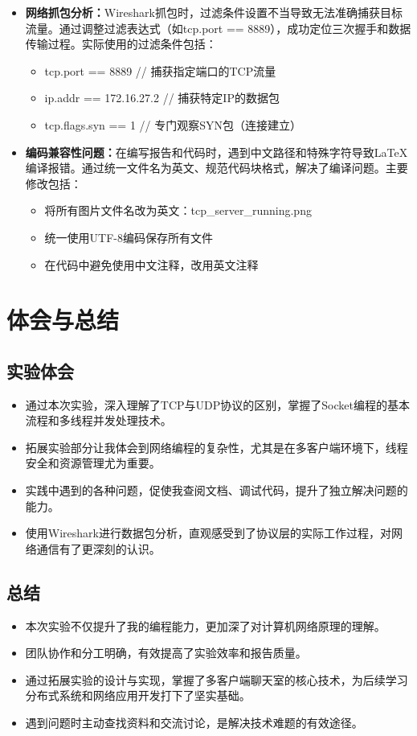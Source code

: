 \documentclass[a4paper]{article}
\begin{document}
\begin{itemize}
\begin{verbatim}
    if (strlen(buffer) > 0) {
        strcpy(client->username, buffer);
    }
}
    \end{verbatim}
    
    \item \textbf{网络抓包分析：}Wireshark抓包时，过滤条件设置不当导致无法准确捕获目标流量。通过调整过滤表达式（如tcp.port == 8889），成功定位三次握手和数据传输过程。实际使用的过滤条件包括：
    \begin{itemize}
        \item tcp.port == 8889  // 捕获指定端口的TCP流量
        \item ip.addr == 172.16.27.2  // 捕获特定IP的数据包
        \item tcp.flags.syn == 1  // 专门观察SYN包（连接建立）
    \end{itemize}
    
    \item \textbf{编码兼容性问题：}在编写报告和代码时，遇到中文路径和特殊字符导致LaTeX编译报错。通过统一文件名为英文、规范代码块格式，解决了编译问题。主要修改包括：
    \begin{itemize}
        \item 将所有图片文件名改为英文：tcp\_server\_running.png
        \item 统一使用UTF-8编码保存所有文件
        \item 在代码中避免使用中文注释，改用英文注释
    \end{itemize}
\end{itemize}

\section{体会与总结}

\subsection{实验体会}
\begin{itemize}
    \item 通过本次实验，深入理解了TCP与UDP协议的区别，掌握了Socket编程的基本流程和多线程并发处理技术。
    \item 拓展实验部分让我体会到网络编程的复杂性，尤其是在多客户端环境下，线程安全和资源管理尤为重要。
    \item 实践中遇到的各种问题，促使我查阅文档、调试代码，提升了独立解决问题的能力。
    \item 使用Wireshark进行数据包分析，直观感受到了协议层的实际工作过程，对网络通信有了更深刻的认识。
\end{itemize}

\subsection{总结}
\begin{itemize}
    \item 本次实验不仅提升了我的编程能力，更加深了对计算机网络原理的理解。
    \item 团队协作和分工明确，有效提高了实验效率和报告质量。
    \item 通过拓展实验的设计与实现，掌握了多客户端聊天室的核心技术，为后续学习分布式系统和网络应用开发打下了坚实基础。
    \item 遇到问题时主动查找资料和交流讨论，是解决技术难题的有效途径。
\end{itemize}
\end{document}
